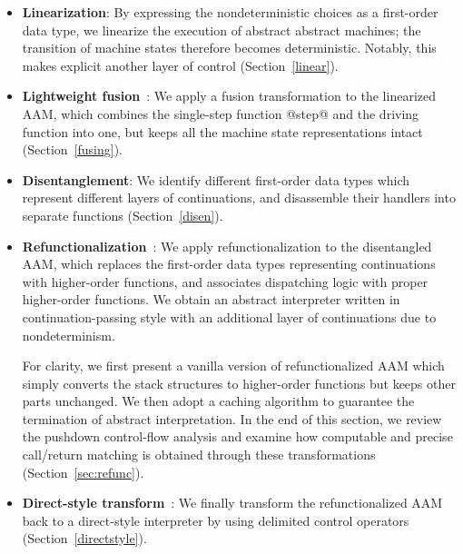 \documentclass[acmsmall, review]{acmart}\settopmatter{}
\begin{document}
\begin{itemize}
  \item \textbf{Linearization}: By expressing the
    nondeterministic choices as a first-order data type, we linearize the execution
    of abstract abstract machines; the transition of machine states therefore becomes
    deterministic. Notably, this makes explicit another layer of control (Section~\ref{linear}). 

  \item \textbf{Lightweight fusion}~\cite{DANVY2008100,Ohori:2007:LFF:1190216.1190241}:
    We apply a fusion transformation to the linearized AAM, which
    combines the single-step function @step@ and the 
    driving function into one, but keeps all the machine state representations intact
    (Section~\ref{fusing}).

  \item \textbf{Disentanglement}: We identify 
    different first-order data types which represent different layers of continuations, and
    disassemble their handlers into separate functions 
    (Section~\ref{disen}).

  \item \textbf{Refunctionalization}~\cite{DANVY2009534,Danvy:2006:RW:2171265.2171268}:
    We apply refunctionalization to the disentangled AAM, which
    replaces the first-order data types representing continuations with
    higher-order functions, and associates dispatching logic with proper higher-order functions. 
    We obtain an abstract interpreter written in continuation-passing style with an
    additional layer of continuations due to nondeterminism.

    For clarity, we first present a vanilla version of refunctionalized AAM which simply
    converts the stack structures to higher-order functions but keeps other parts unchanged.
    We then adopt a caching algorithm \cite{darais2017abstracting} to guarantee the termination 
    of abstract interpretation.
    In the end of this section, we review the pushdown control-flow analysis and examine how 
    computable and precise call/return matching is obtained through these transformations
    (Section~\ref{sec:refunc}).

  \item \textbf{Direct-style transform}~\cite{DBLP:journals/scp/Danvy94}:
    We finally transform the refunctionalized AAM back to a
    direct-style interpreter by using delimited control operators
    (Section~\ref{directstyle}).
\end{itemize}
\end{document}
